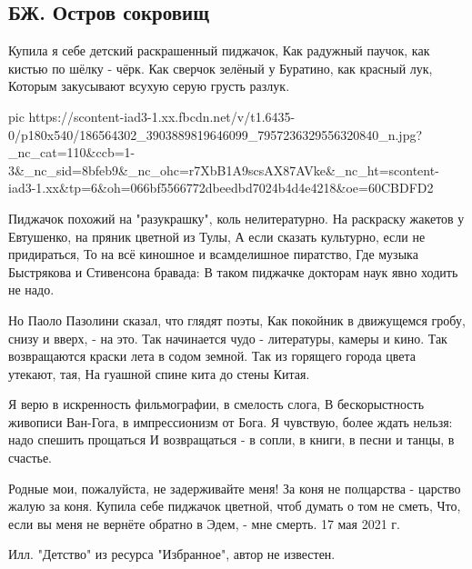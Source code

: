  
 
 
 
 
\subsection{БЖ. Остров сокровищ}
\label{sec:18_05_2021.fb.bilchenko_evgenia.1.ostrov_sokrovisch}

Купила я себе детский раскрашенный пиджачок,
Как радужный паучок, как кистью по шёлку - чёрк.
Как сверчок зелёный у Буратино, как красный лук,
Которым закусывают всухую серую грусть разлук.

\ifcmt
  pic https://scontent-iad3-1.xx.fbcdn.net/v/t1.6435-0/p180x540/186564302_3903889819646099_7957236329556320840_n.jpg?_nc_cat=110&ccb=1-3&_nc_sid=8bfeb9&_nc_ohc=r7XbB1A9scsAX87AVke&_nc_ht=scontent-iad3-1.xx&tp=6&oh=066bf5566772dbeedbd7024b4d4e4218&oe=60CBDFD2
\fi

Пиджачок похожий на "разукрашку", коль нелитературно.
На раскраску жакетов у Евтушенко, на пряник цветной из Тулы,
А если сказать культурно, если не придираться,
То на всё киношное и всамделишное пиратство,
Где музыка Быстрякова и Стивенсона бравада:
В таком пиджачке докторам наук явно ходить не надо.

Но Паоло Пазолини сказал, что глядят поэты,
Как покойник в движущемся гробу, снизу и вверх, - на это.
Так начинается чудо - литературы, камеры и кино.
Так возвращаются краски лета в содом земной.
Так из горящего города цвета утекают, тая,
На гуашной спине кита до стены Китая.

Я верю в искренность фильмографии, в смелость слога,
В бескорыстность живописи Ван-Гога, в импрессионизм от Бога.
Я чувствую, более ждать нельзя: надо спешить прощаться
И возвращаться - в сопли, в книги, в песни и танцы, в счастье.

Родные мои, пожалуйста, не задерживайте меня!
За коня не полцарства - царство жалую за коня.
Купила себе пиджачок цветной, чтоб думать о том не сметь,
Что, если вы меня не вернёте обратно в Эдем, - мне смерть.
17 мая 2021 г.

Илл. "Детство" из ресурса "Избранное", автор не известен.
